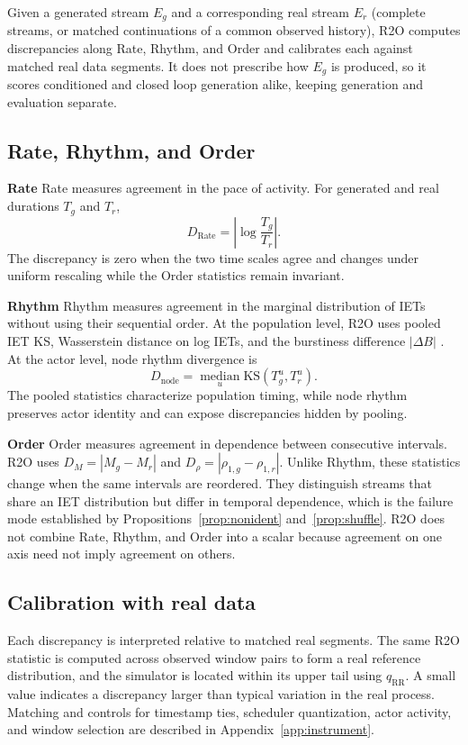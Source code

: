 \documentclass{article}
\begin{document}
Given a generated stream $E_g$ and a corresponding real stream $E_r$ (complete
streams, or matched continuations of a common observed history), R2O computes
discrepancies along Rate, Rhythm, and Order and calibrates each against
matched real data segments.\label{sec:r2o_protocol} It does not prescribe how
$E_g$ is produced, so it scores conditioned and closed loop generation alike,
keeping generation and evaluation separate.

\subsection{Rate, Rhythm, and Order}
\label{sec:r2o_axes}

\noindent \textbf{Rate}
Rate measures agreement in the pace of activity. For generated and
real durations $T_g$ and $T_r$,
\[
D_{\mathrm{Rate}}=\left|\log\frac{T_g}{T_r}\right|.
\]
The discrepancy is zero when the two time scales agree and changes under
uniform rescaling while the Order statistics remain invariant.

\noindent \textbf{Rhythm}
Rhythm measures agreement in the marginal distribution of IETs without using
their sequential order. At the population level, R2O uses pooled IET KS,
Wasserstein distance on log IETs, and the burstiness difference $|\Delta B|$
\citep{goh2008burstiness,karsai2012universal}. At the actor level, node rhythm
divergence is
\[
D_{\mathrm{node}}=
\operatorname*{median}_{u}\mathrm{KS}\!\left(T_g^u,T_r^u\right).
\]
The pooled statistics characterize population timing, while node rhythm
preserves actor identity and can expose discrepancies hidden by pooling.

\noindent \textbf{Order}
Order measures agreement in dependence between consecutive intervals. R2O
uses $D_M=|M_g-M_r|$ and
$D_{\rho}=|\rho_{1,g}-\rho_{1,r}|$. Unlike Rhythm, these statistics change
when the same intervals are reordered. They distinguish streams that
share an IET distribution but differ in temporal dependence, which is the
failure mode established by Propositions~\ref{prop:nonident}
and~\ref{prop:shuffle}. R2O does not combine Rate, Rhythm, and Order into a scalar because
agreement on one axis need not imply agreement on others.

\subsection{Calibration with real data}
\label{sec:r2o_calibration}

Each discrepancy is interpreted relative to matched real segments. The same R2O
statistic is computed across observed window pairs to form a real reference
distribution, and the simulator is located within its upper tail using
$q_{\mathrm{RR}}$. A small value indicates a discrepancy larger than typical
variation in the real process. Matching and controls for timestamp ties,
scheduler quantization, actor activity, and window selection are described in
Appendix~\ref{app:instrument}.
\end{document}
